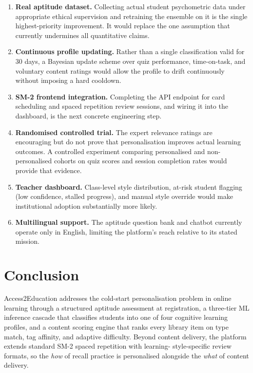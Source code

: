 \documentclass[12pt,a4paper]{article}
\begin{document}
\begin{enumerate}[leftmargin=*]
  \item \textbf{Real aptitude dataset.} Collecting actual student
    psychometric data under appropriate ethical supervision and
    retraining the ensemble on it is the single highest-priority
    improvement. It would replace the one assumption that currently
    undermines all quantitative claims.
  \item \textbf{Continuous profile updating.} Rather than a single
    classification valid for 30 days, a Bayesian update scheme
    over quiz performance, time-on-task, and voluntary content
    ratings would allow the profile to drift continuously without
    imposing a hard cooldown.
  \item \textbf{SM-2 frontend integration.} Completing the API
    endpoint for card scheduling and spaced repetition review
    sessions, and wiring it into the dashboard, is the next concrete
    engineering step.
  \item \textbf{Randomised controlled trial.} The expert relevance
    ratings are encouraging but do not prove that personalisation
    improves actual learning outcomes. A controlled experiment
    comparing personalised and non-personalised cohorts on quiz
    scores and session completion rates would provide that evidence.
  \item \textbf{Teacher dashboard.} Class-level style distribution,
    at-risk student flagging (low confidence, stalled progress),
    and manual style override would make institutional adoption
    substantially more likely.
  \item \textbf{Multilingual support.} The aptitude question bank
    and chatbot currently operate only in English, limiting the
    platform's reach relative to its stated mission.
\end{enumerate}

\section{Conclusion}

Access2Education addresses the cold-start personalisation problem
in online learning through a structured aptitude assessment at
registration, a three-tier ML inference cascade that classifies
students into one of four cognitive learning profiles, and a
content scoring engine that ranks every library item on type match,
tag affinity, and adaptive difficulty. Beyond content delivery,
the platform extends standard SM-2 spaced repetition with learning-
style-specific review formats, so the \emph{how} of recall practice
is personalised alongside the \emph{what} of content delivery.
\end{document}

